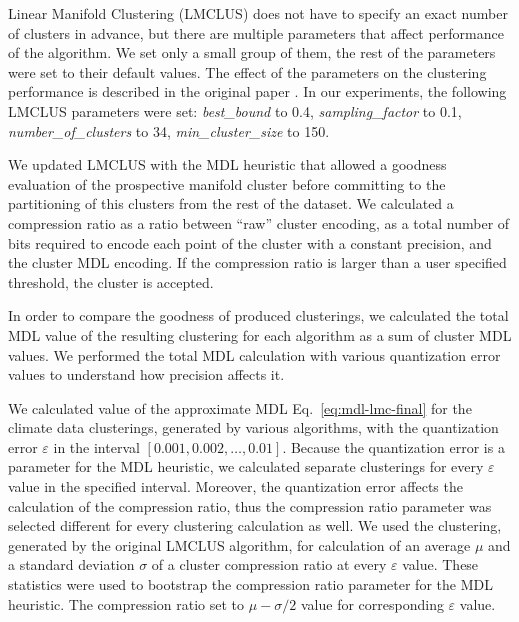 Linear Manifold Clustering (LMCLUS) does not have to specify an exact number of
clusters in advance, but there are multiple parameters that affect performance
of the algorithm. We set only a small group of them, the rest of the parameters
were set to their default values. The effect of the parameters
on the clustering performance is described in the original paper \cite{Haralick:2007rt}.
In our experiments, the following LMCLUS parameters were set:
\emph{best\_bound} to 0.4, \emph{sampling\_factor} to 0.1,
\emph{number\_of\_clusters} to 34, \emph{min\_cluster\_size} to 150.

We updated LMCLUS with the MDL heuristic that allowed a goodness evaluation
of the prospective manifold cluster before committing to the partitioning of
this clusters from the rest of the dataset. We calculated a compression ratio
as a ratio between ``raw'' cluster encoding, as a total number of bits required
to encode each point of the cluster with a constant precision, and
the cluster MDL encoding. If the compression ratio is larger than a user
specified threshold, the cluster is accepted.

In order to compare the goodness of produced clusterings, we calculated
the total MDL value of the resulting clustering for each algorithm as a sum of
cluster MDL values. We performed the total MDL calculation with various
quantization error values to understand how precision affects it.

We calculated value of the approximate MDL Eq.~\eqref{eq:mdl-lmc-final} for
the climate data clusterings, generated by various algorithms, with
the quantization error $\varepsilon$ in
the interval $\left[0.001, 0.002, \dots, 0.01 \right]$.
Because the quantization error is a parameter for the MDL heuristic,
we calculated separate clusterings for every $\varepsilon$ value in
the specified interval. Moreover, the quantization error affects the calculation
of the compression ratio, thus the compression ratio parameter was
selected different for every clustering calculation as well.
We used the clustering, generated by the original LMCLUS algorithm, for
calculation of an average $\mu$ and a standard deviation $\sigma$ of
a cluster compression ratio at every $\varepsilon$ value.
These statistics were used to bootstrap the compression ratio parameter
for the MDL heuristic. The compression ratio set to $\mu-\sigma/2$ value for
corresponding $\varepsilon$ value.

